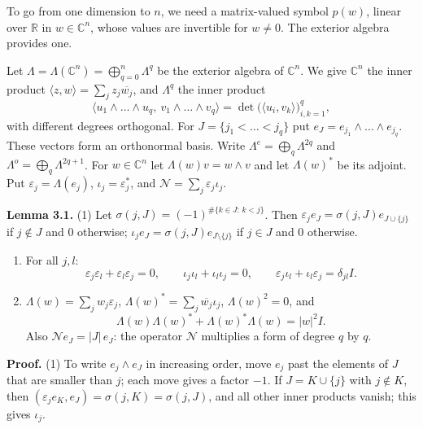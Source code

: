\documentclass[
  11pt,
]{article}
\providecommand{\tightlist}{%
  \setlength{\itemsep}{0pt}\setlength{\parskip}{0pt}}
\begin{document}
To go from one dimension to \(n\), we need a matrix-valued symbol
\(p(w)\), linear over \(\mathbb R\) in \(w\in\mathbb C^n\), whose values
are invertible for \(w\ne0\). The exterior algebra provides one.

Let \(\Lambda=\Lambda(\mathbb C^n)=\bigoplus_{q=0}^n\Lambda^q\) be the
exterior algebra of \(\mathbb C^n\). We give \(\mathbb C^n\) the inner
product \(\langle z,w\rangle=\sum_jz_j\overline{w_j}\), and
\(\Lambda^q\) the inner product \[
\langle u_1\wedge\dots\wedge u_q,\ v_1\wedge\dots\wedge v_q\rangle=\det\bigl(\langle u_i,v_k\rangle\bigr)_{i,k=1}^q,
\] with different degrees orthogonal. For \(J=\{j_1<\dots<j_q\}\) put
\(e_J=e_{j_1}\wedge\dots\wedge e_{j_q}\). These vectors form an
orthonormal basis. Write \(\Lambda^e=\bigoplus_q\Lambda^{2q}\) and
\(\Lambda^o=\bigoplus_q\Lambda^{2q+1}\). For \(w\in\mathbb C^n\) let
\(\Lambda(w)v=w\wedge v\) and let \(\Lambda(w)^*\) be its adjoint. Put
\(\varepsilon_j=\Lambda(e_j)\), \(\iota_j=\varepsilon_j^*\), and
\(\mathcal N=\sum_j\varepsilon_j\iota_j\).

\textbf{Lemma 3.1.} (1) Let \(\sigma(j,J)=(-1)^{\#\{k\in J:\,k<j\}}\).
Then \(\varepsilon_je_J=\sigma(j,J)e_{J\cup\{j\}}\) if \(j\notin J\) and
\(0\) otherwise; \(\iota_je_J=\sigma(j,J)e_{J\setminus\{j\}}\) if
\(j\in J\) and \(0\) otherwise.

\begin{enumerate}
\def\labelenumi{(\arabic{enumi})}
\setcounter{enumi}{1}
\tightlist
\item
  For all \(j,l\): \[
\varepsilon_j\varepsilon_l+\varepsilon_l\varepsilon_j=0,\qquad
\iota_j\iota_l+\iota_l\iota_j=0,\qquad
\varepsilon_j\iota_l+\iota_l\varepsilon_j=\delta_{jl}I .
\tag{3.1}
\]
\item
  \(\Lambda(w)=\sum_jw_j\varepsilon_j\),
  \(\Lambda(w)^*=\sum_j\overline{w_j}\iota_j\), \(\Lambda(w)^2=0\), and
  \[
\Lambda(w)\Lambda(w)^*+\Lambda(w)^*\Lambda(w)=|w|^2I .
\tag{3.2}
\] Also \(\mathcal Ne_J=|J|\,e_J\): the operator \(\mathcal N\)
  multiplies a form of degree \(q\) by \(q\).
\end{enumerate}

\textbf{Proof.} (1) To write \(e_j\wedge e_J\) in increasing order, move
\(e_j\) past the elements of \(J\) that are smaller than \(j\); each
move gives a factor \(-1\). If \(J=K\cup\{j\}\) with \(j\notin K\), then
\((\varepsilon_je_K,e_J)=\sigma(j,K)=\sigma(j,J)\), and all other inner
products vanish; this gives \(\iota_j\).
\end{document}
